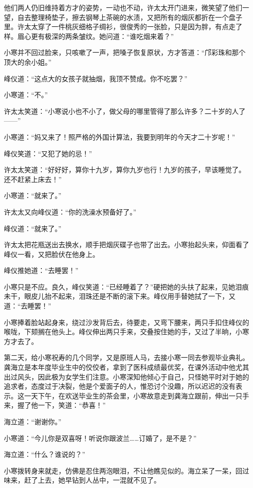 \par 他们两人仍旧维持着方才的姿势，一动也不动，许太太开门进来，微笑望了他们一望，自去整理椅垫子，擦去钢琴上茶碗的水渍，又把所有的烟灰都折在一个盘子里。许太太穿了一件桃灰细格子绸衫，很俊秀的一张脸，只是因为胖，有点走了样。眉心更有极深的两条皱纹。她问道：“谁吃烟来着？”
\par 小寒并不回过脸来，只咳嗽了一声，把嗓子恢复原状，方才答道：“邝彩珠和那个顶大的余小姐。”
\par 峰仪道：“这点大的女孩子就抽烟，我顶不赞成。你不吃罢？”
\par 小寒道：“不。”
\par 许太太笑道：“小寒说小也不小了，做父母的哪里管得了那么许多？二十岁的人了——”
\par 小寒道：“妈又来了！照严格的外国计算法，我要到明年的今天才二十岁呢！”
\par 峰仪笑道：“又犯了她的忌！”
\par 许太太笑道：“好好好，算你十九岁，算你九岁也行！九岁的孩子，早该睡觉了。还不赶紧上床去！”
\par 小寒道：“就来了。”
\par 许太太又向峰仪道：“你的洗澡水预备好了。”
\par 峰仪道：“就来了。”
\par 许太太把花瓶送出去换水，顺手把烟灰碟子也带了出去。小寒抬起头来，仰面看了峰仪一看，又把脸伏在他身上。
\par 峰仪推她道：“去睡罢！”
\par 小寒只是不应。良久，峰仪笑道：“已经睡着了？”硬把她的头扶了起来，见她泪痕未干，眼皮儿抬不起来，泪珠还是不断的滚下来。峰仪用手替她拭了一下，又道：“去睡罢！”
\par 小寒捧着脸站起身来，绕过沙发背后去，待要走，又弯下腰来，两只手扣住峰仪的喉咙，下颏搁在他头上。峰仪伸出两只手来，交叠按住她的手，又过了半晌，小寒方才去了。
\par 第二天，给小寒祝寿的几个同学，又是原班人马，去接小寒一同去参观毕业典礼。龚海立是本年度毕业生中的佼佼者，拿到了医科成绩最优奖，在课外活动中他尤其出过风头，因此极为女学生们注意。小寒深知他倾心于自己，只怪她平时对于她的追求者，态度过于决裂，他是个爱面子的人，惟恐讨个没趣，所以迟迟的没有表示。这一天下午，在欢送毕业生的茶会里，小寒故意走到龚海立跟前，伸出一只手来，握了他一下，笑道：“恭喜！”
\par 海立道：“谢谢你。”
\par 小寒道：“今儿你是双喜呀！听说你跟波兰……订婚了，是不是？”
\par 海立道：“什么？谁说的？”
\par 小寒拨转身来就走，仿佛是忍住两泡眼泪，不让他瞧见似的。海立呆了一呆，回过味来，赶了上去，她早钻到人丛中，一混就不见了。
